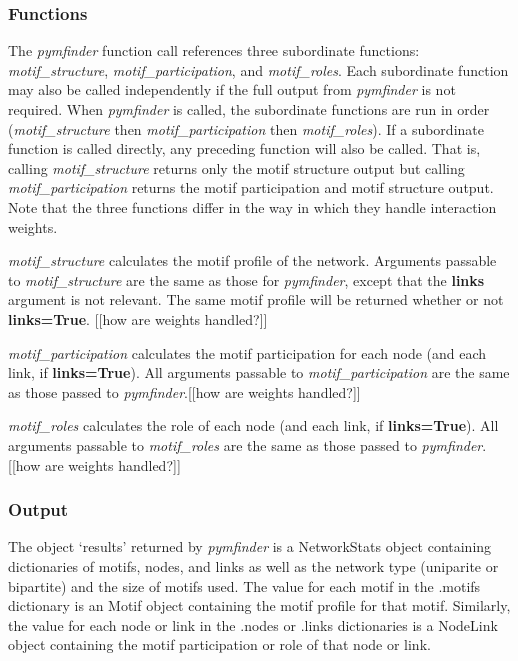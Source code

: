 \documentclass[12pt]{article}
\begin{document}
		\subsubsection{Functions}

			The \emph{pymfinder} function call references three subordinate functions: \emph{motif_structure}, \emph{motif_participation}, and \emph{motif_roles}. Each subordinate function may also be called independently if the full output from \emph{pymfinder} is not required. When \emph{pymfinder} is called, the subordinate functions are run in order (\emph{motif_structure} then \emph{motif_participation} then \emph{motif_roles}). If a subordinate function is called directly, any preceding function will also be called. That is, calling \emph{motif_structure} returns only the motif structure output but calling \emph{motif_participation} returns the motif participation and motif structure output. Note that the three functions differ in the way in which they handle interaction weights.


			\emph{motif_structure} calculates the motif profile of the network. Arguments passable to \emph{motif_structure} are the same as those for \emph{pymfinder}, except that the \textbf{links} argument is not relevant. The same motif profile will be returned whether or not \textbf{links=True}. [[how are weights handled?]]


			\emph{motif_participation} calculates the motif participation for each node (and each link, if \textbf{links=True}). All arguments passable to \emph{motif_participation} are the same as those passed to \emph{pymfinder}.[[how are weights handled?]]


			\emph{motif_roles} calculates the role of each node (and each link, if \textbf{links=True}). All arguments passable to \emph{motif_roles} are the same as those passed to \emph{pymfinder}.[[how are weights handled?]]


		\subsubsection{Output}

			The object `results' returned by \emph{pymfinder} is a NetworkStats object containing dictionaries of motifs, nodes, and links as well as the network type (uniparite or bipartite) and the size of motifs used. The value for each motif in the .motifs dictionary is an Motif object containing the motif profile for that motif. Similarly, the value for each node or link in the .nodes or .links dictionaries is a NodeLink object containing the motif participation or role of that node or link.
\end{document}
